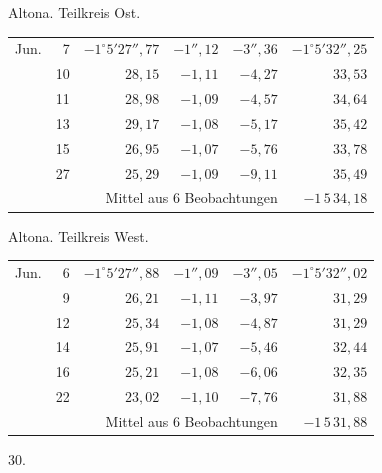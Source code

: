 \noindent\begin{minipage}[t]{.495\textwidth}\centering Altona. Teilkreis Ost.\par\smallskip
{\scriptsize\setlength{\tabcolsep}{1pt}\renewcommand{\arraystretch}{1.2}\begin{tabular}{lr|r|r|r|r|}
Jun.&7&$-1^\circ5'27''{,}77$&$-1''{,}12$&$-3''{,}36$&$-1^\circ5'32''{,}25$\\
&10&$28{,}15$&$-1{,}11$&$-4{,}27$&$33{,}53$\\
&11&$28{,}98$&$-1{,}09$&$-4{,}57$&$34{,}64$\\
&13&$29{,}17$&$-1{,}08$&$-5{,}17$&$35{,}42$\\
&15&$26{,}95$&$-1{,}07$&$-5{,}76$&$33{,}78$\\
&27&$25{,}29$&$-1{,}09$&$-9{,}11$&$35{,}49$\\
\cline{6-6}\multicolumn{5}{r}{Mittel aus 6 Beobachtungen}&$-1\,5\,34{,}18$
\end{tabular}}\end{minipage}\hfill\begin{minipage}[t]{.495\textwidth}\centering Altona. Teilkreis West.\par\smallskip
{\scriptsize\setlength{\tabcolsep}{1pt}\renewcommand{\arraystretch}{1.2}\begin{tabular}{lr|r|r|r|r}
Jun.&6&$-1^\circ5'27''{,}88$&$-1''{,}09$&$-3''{,}05$&$-1^\circ5'32''{,}02$\\
&9&$26{,}21$&$-1{,}11$&$-3{,}97$&$31{,}29$\\
&12&$25{,}34$&$-1{,}08$&$-4{,}87$&$31{,}29$\\
&14&$25{,}91$&$-1{,}07$&$-5{,}46$&$32{,}44$\\
&16&$25{,}21$&$-1{,}08$&$-6{,}06$&$32{,}35$\\
&22&$23{,}02$&$-1{,}10$&$-7{,}76$&$31{,}88$\\
\cline{6-6}\multicolumn{5}{r}{Mittel aus 6 Beobachtungen}&$-1\,5\,31{,}88$
\end{tabular}}\end{minipage}
\par\vspace{4mm}
\begin{center}30.\end{center}


